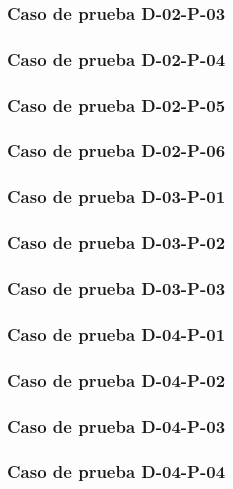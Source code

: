 \documentclass[10pt,a4paper]{article}
\begin{document}
			\subsubsection{Caso de prueba D-02-P-03}

			\subsubsection{Caso de prueba D-02-P-04}

			\subsubsection{Caso de prueba D-02-P-05}

			\subsubsection{Caso de prueba D-02-P-06}

			\subsubsection{Caso de prueba D-03-P-01}

			\subsubsection{Caso de prueba D-03-P-02}

			\subsubsection{Caso de prueba D-03-P-03}

			\subsubsection{Caso de prueba D-04-P-01}

			\subsubsection{Caso de prueba D-04-P-02}

			\subsubsection{Caso de prueba D-04-P-03}

			\subsubsection{Caso de prueba D-04-P-04}
\end{document}
